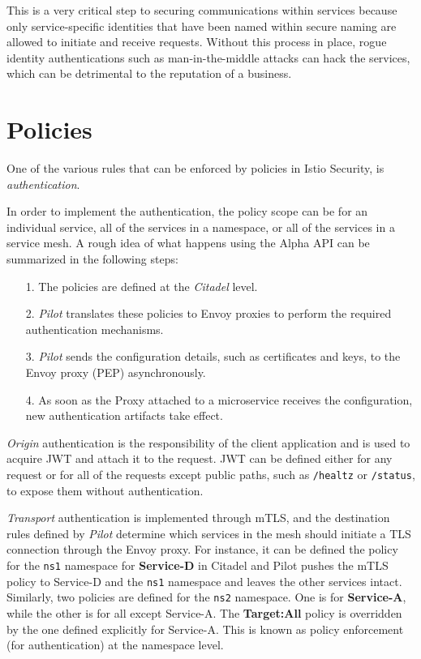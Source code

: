 This is a very critical step to securing communications within services because only service-specific identities that have been named within secure naming are allowed to initiate and receive requests. Without this process in place, rogue identity authentications such as man-in-the-middle attacks can hack the services, which can be detrimental to the reputation of a business.

\section{Policies}
One of the various rules that can be enforced by policies in Istio Security, is \textit{authentication}. 

In order to implement the authentication, the policy scope can be for an individual service, all of the services in a namespace, or all of the services in a service mesh. A rough idea of what happens using the Alpha API can be summarized in the following steps:

\begin{itemize}
    \item[1.] The policies are defined at the \textit{Citadel} level.
    \item[2.] \textit{Pilot} translates these policies to Envoy proxies to perform the required authentication mechanisms.
    \item[3.] \textit{Pilot} sends the configuration details, such as certificates and keys, to the Envoy proxy (PEP) asynchronously.
    \item[4.] As soon as the Proxy attached to a microservice receives the configuration, new authentication artifacts take effect. 
\end{itemize}

\textit{Origin} authentication is the responsibility of the client application and is used to acquire JWT and attach it to the request. JWT can be defined either for any request or for all of the requests except public paths, such as \texttt{/healtz} or \texttt{/status}, to expose them without authentication.

\textit{Transport} authentication is implemented through mTLS, and the destination rules defined by \textit{Pilot} determine which services in the mesh should initiate a TLS connection through the Envoy proxy.
For instance, it can be defined the policy for the \texttt{ns1} namespace for
\textbf{Service-D} in Citadel and Pilot pushes the mTLS policy to Service-D and 
the \texttt{ns1} namespace and leaves the other services intact. Similarly, two 
policies are defined for the \texttt{ns2} namespace. One is for 
\textbf{Service-A}, while the other is for all except Service-A. The 
\textbf{Target:All} policy is overridden by the one defined explicitly for 
Service-A.
This is known as policy enforcement (for authentication) at the namespace level.

